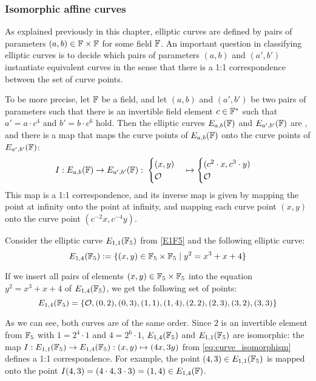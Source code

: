 \subsubsection{Isomorphic affine  curves}
\label{sec:isomorphic_curves} As explained previously in this chapter, elliptic curves are defined by pairs of parameters $(a, b)\in \mathbb{F}\times \mathbb{F}$ for some field $\mathbb{F}$. An important question in classifying elliptic curves is to decide which pairs of parameters $(a,b)$ and $(a',b')$ instantiate equivalent curves in the sense that there is a 1:1 correspondence between the set of curve points.

To be more precise, let $\mathbb{F}$ be a field, and let $(a,b)$ and $(a',b')$ be two pairs of parameters such that there is an invertible field element $c\in \mathbb{F}^*$ such that $a' = a\cdot c^4$ and $b' = b\cdot c^6$ hold. Then the elliptic curves $E_{a,b}(\mathbb{F})$ and $E_{a',b'}(\mathbb{F})$ are , and there is a map that maps the curve points of $E_{a,b}(\mathbb{F})$ onto the curve points of $E_{a',b'}(\mathbb{F})$:
\begin{equation}
\label{eq:curve_isomorphism}
I: E_{a,b}(\mathbb{F}) \to E_{a',b'}(\mathbb{F}):\; \begin{cases}(x,y)\\\mathcal{O}\end{cases}
\mapsto \begin{cases}(c^2\cdot x,c^3\cdot y)\\\mathcal{O}\end{cases}
\end{equation}
This map is a 1:1 correspondence, and its inverse map is given by mapping the point at infinity onto the point at infinity, and mapping each curve point $(x,y)$ onto the curve point $(c^{-2}x,c^{-4}y)$.
\begin{example}
\label{ex:isomorphic_E1F5}
 Consider the  elliptic curve $E_{1,1}(\mathbb{F}_5)$ from \examplename{} \ref{E1F5} and the following elliptic curve:
\begin{equation}
E_{1,4}(\mathbb{F}_5):= \{(x,y)\in \mathbb{F}_5\times \mathbb{F}_5 \; | \; y^2 = x^3 + x + 4 \}
\end{equation}

If we insert all pairs of elements $(x,y)\in \mathbb{F}_5\times \mathbb{F}_5$ into the  equation $y^2 = x^3 + x + 4$ of $E_{1,4}(\mathbb{F}_5)$, we get the following set of points:
\begin{equation}
E_{1,4}(\mathbb{F}_5) = \{
\mathcal{O}, (0,2), (0,3), (1,1), (1,4), (2,2), (2,3), (3,2), (3,3)\}
\end{equation}

As we can see, both curves are of the same order. Since $2$ is an invertible element from $\mathbb{F}_5$ with $1 = 2^4\cdot 1$ and $4=2^6\cdot 1$, $E_{1,4}(\mathbb{F}_5)$ and $E_{1,1}(\mathbb{F}_5)$ are isomorphic: the map $I: E_{1,1}(\mathbb{F}_5)\to E_{1,4}(\mathbb{F}_5): (x,y)\mapsto (4x,3y)$ from \ref{eq:curve_isomorphism} defines a 1:1 correspondence. For example, the point $(4,3)\in E_{1,1}(\mathbb{F}_5)$ is mapped onto the point $I(4,3)=(4\cdot 4, 3\cdot 3) = (1,4)\in E_{1,4}(\mathbb{F})$.
\end{example}
  
